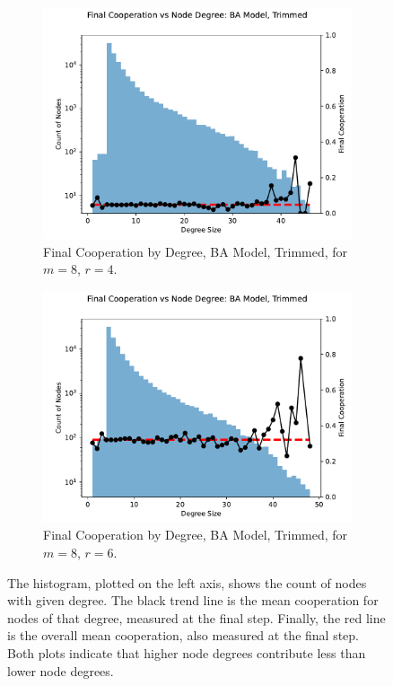 \FloatBarrier 
\begin{figure}[!h]
  \begin{subfigure}[b]{0.45\textwidth}
    \includegraphics[width=1.1\textwidth]{images/Rep_BA_node_groups_m_8_phi_4_trimmed.pdf}
    \caption{Final Cooperation by Degree, BA Model, Trimmed, for $m=8$, $r=4$.   }
    \label{ID_by_degree_m_8_phi_4}
  \end{subfigure}
  \hfill
  \begin{subfigure}[b]{0.45\textwidth}
    \includegraphics[width=1.1\textwidth]{images/Rep_BA_node_groups_m_8_phi_6_trimmed.pdf}
    \caption{Final Cooperation by Degree, BA Model, Trimmed, for $m=8$, $r=6$. }
    \label{ID_by_degree_m_8_phi_6}
  \end{subfigure}
  \caption{The histogram, plotted on the left axis, shows the count of nodes with given degree. The black trend line is the mean cooperation for nodes of that degree, measured at the final step. Finally, the red line is the overall mean cooperation, also measured at the final step. Both plots indicate that higher node degrees contribute less than lower node degrees.} \label{ID_by_degree_m_8}
\end{figure} 
\FloatBarrier

